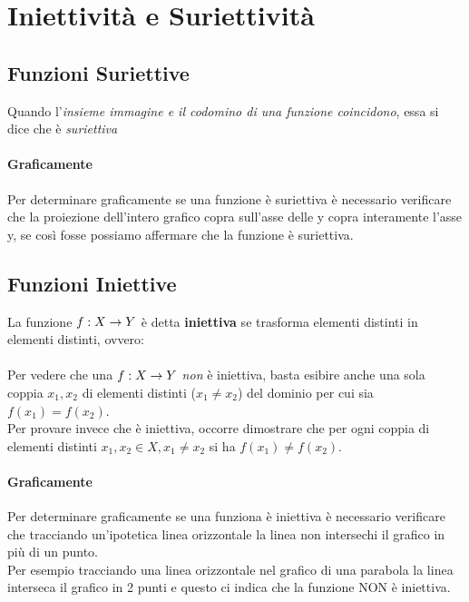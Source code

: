 \documentclass[12pt, a4paper, openany]{book}
\begin{document}
\section{Iniettività e Suriettività}

\subsection*{Funzioni Suriettive}
Quando l'\emph{insieme immagine e il codomino di una funzione coincidono}, essa si dice che è \emph{suriettiva}
\paragraph{Graficamente} Per determinare graficamente se una funzione è suriettiva è necessario verificare che la proiezione dell'intero
grafico copra sull'asse delle y copra interamente l'asse y, se così fosse possiamo affermare che la funzione è suriettiva.
\subsection*{Funzioni Iniettive}
La funzione $f: X \rightarrow Y$ è detta \textbf{iniettiva} se trasforma elementi distinti in elementi distinti, ovvero:
\paragraph{}Per vedere che una $f: X \rightarrow Y$ \emph{non} è iniettiva, basta esibire anche una sola coppia $x_1, x_2$ di elementi distinti ($x_1 \neq x_2$) del dominio per cui sia $f(x_1) = f(x_2)$.
\\Per provare invece che è iniettiva, occorre dimostrare che per ogni coppia di elementi distinti $x_1, x_2 \in X, x_1 \neq x_2$ si ha $f(x_1) \neq f(x_2)$.
\paragraph{Graficamente} Per determinare graficamente se una funziona è iniettiva è necessario verificare che tracciando
 un'ipotetica linea orizzontale la linea non intersechi il grafico in più di un punto.
\\ Per esempio tracciando una linea orizzontale nel grafico di una parabola la linea interseca il grafico in 2 punti e
questo ci indica che la funzione NON è iniettiva.
\end{document}
